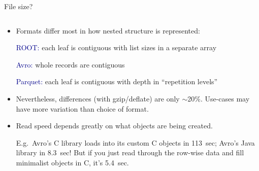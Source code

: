 \documentclass{beamer}
\begin{document}
\begin{frame}{File size?}
\vspace{0.35 cm}
\begin{columns}
\begin{column}{0.55\linewidth}
\begin{itemize}
\item<1-> Formats differ most in how nested structure is represented:
\small

\vspace{0.1 cm}
\textcolor{darkblue}{ROOT:} each leaf is contiguous with list sizes in a separate array

\textcolor{darkblue}{Avro:} whole records are contiguous

\textcolor{darkblue}{Parquet:} each leaf is contiguous with depth in ``repetition levels''

\normalsize
\item<2-> Nevertheless, differences (with gzip/deflate) are only $\sim$20\%. Use-cases may have more variation than choice of format.

\item<3-> Read speed depends greatly on what objects are being created.

\scriptsize
\vspace{0.1 cm}
E.g.\ Avro's C library loads into its custom C objects in 113~sec; Avro's Java library in 8.3~sec! But if you just read through the row-wise data and fill minimalist objects in C, it's 5.4~sec.


\end{itemize}
\end{column}
\end{columns}
\end{frame}
\end{document}

